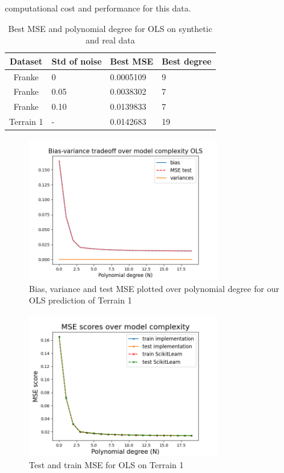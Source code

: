\documentclass[twocolumn,10pt,cleanfoot]{asme2ej}
\begin{document}
computational cost and performance for this data.

\begin{table}[t]
\caption{Best MSE and polynomial degree for OLS on synthetic and real data}
\begin{center}
\label{ols_mse_table_dif_data}
\begin{tabular}{c l l l}
Dataset & Std of noise & Best MSE & Best degree \\
\hline
Franke & 0 & 0.0005109 & 9\\
Franke & 0.05 & 0.0038302 & 7 \\
Franke & 0.10 & 0.0139833 & 7 \\
Terrain 1 & - & 0.0142683 & 19 \\
\hline
\end{tabular}
\end{center}
\end{table}

\begin{figure} 
\centerline{\includegraphics[width=3.25in]{figure/realbiasvarianceOLS.png}}
\caption{Bias, variance and test MSE plotted over polynomial degree for our OLS prediction of Terrain 1}
\label{realbiasvarianceOLS}
\end{figure}



\begin{figure} 
\centerline{\includegraphics[width=3.25in]{figure/real1msetraintest.png}}
\caption{Test and train MSE for OLS on Terrain 1}
\label{real1msetraintest}
\end{figure}
\end{document}
